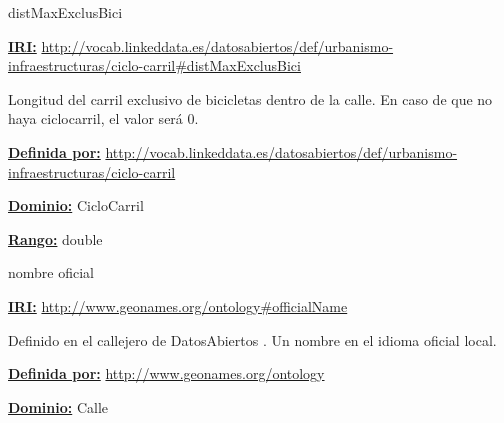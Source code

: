 \begin{mybox}{distMaxExclusBici}
\begin{flushleft}
\underline{\textbf{IRI:}}
\url{http://vocab.linkeddata.es/datosabiertos/def/urbanismo-infraestructuras/ciclo-carril#distMaxExclusBici}
\newline

Longitud del carril exclusivo de bicicletas dentro de la calle.
En caso de que no haya ciclocarril, el valor será 0.
\newline


\underline{\textbf{Definida por:}}
\url{http://vocab.linkeddata.es/datosabiertos/def/urbanismo-infraestructuras/ciclo-carril}
\newline

\underline{\textbf{Dominio:}}
	CicloCarril
\newline

\underline{\textbf{Rango:}}
	double
\newline

\end{flushleft}
\end{mybox}



\begin{mybox}{nombre oficial}
\begin{flushleft}
\underline{\textbf{IRI:}}
\url{http://www.geonames.org/ontology#officialName}
\newline

Definido en el callejero de DatosAbiertos \cite{ciudadesbiertas_callejero}.
Un nombre en el idioma oficial local.
\newline


\underline{\textbf{Definida por:}}
\url{http://www.geonames.org/ontology}
\newline

\underline{\textbf{Dominio:}}
	Calle
\newline


\end{flushleft}
\end{mybox}
































